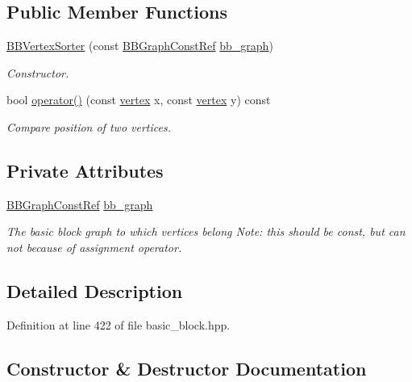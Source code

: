 \subsection*{Public Member Functions}
\begin{DoxyCompactItemize}
\item 
\hyperlink{classBBVertexSorter_af03e171a17759aa1df6c3ec7ef9909ec}{B\+B\+Vertex\+Sorter} (const \hyperlink{basic__block_8hpp_ab66bdbde3a29e41d079d8a320af9c921}{B\+B\+Graph\+Const\+Ref} \hyperlink{classBBVertexSorter_a56dc2b2e2e26f2c91300b9c985533b23}{bb\+\_\+graph})
\begin{DoxyCompactList}\small\item\em Constructor. \end{DoxyCompactList}\item 
bool \hyperlink{classBBVertexSorter_a0943b78b2e713d833b00a78e20703588}{operator()} (const \hyperlink{graph_8hpp_abefdcf0544e601805af44eca032cca14}{vertex} x, const \hyperlink{graph_8hpp_abefdcf0544e601805af44eca032cca14}{vertex} y) const
\begin{DoxyCompactList}\small\item\em Compare position of two vertices. \end{DoxyCompactList}\end{DoxyCompactItemize}
\subsection*{Private Attributes}
\begin{DoxyCompactItemize}
\item 
\hyperlink{basic__block_8hpp_ab66bdbde3a29e41d079d8a320af9c921}{B\+B\+Graph\+Const\+Ref} \hyperlink{classBBVertexSorter_a56dc2b2e2e26f2c91300b9c985533b23}{bb\+\_\+graph}
\begin{DoxyCompactList}\small\item\em The basic block graph to which vertices belong Note\+: this should be const, but can not because of assignment operator. \end{DoxyCompactList}\end{DoxyCompactItemize}


\subsection{Detailed Description}


Definition at line 422 of file basic\+\_\+block.\+hpp.



\subsection{Constructor \& Destructor Documentation}
\mbox{\label{classBBVertexSorter_af03e171a17759aa1df6c3ec7ef9909ec}} 
